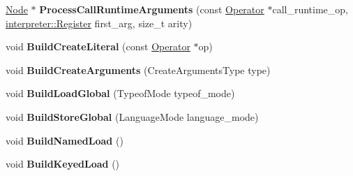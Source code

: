 \begin{DoxyCompactItemize}
\item 
\hyperlink{classv8_1_1internal_1_1compiler_1_1_node}{Node} $\ast$ {\bfseries Process\+Call\+Runtime\+Arguments} (const \hyperlink{classv8_1_1internal_1_1compiler_1_1_operator}{Operator} $\ast$call\+\_\+runtime\+\_\+op, \hyperlink{classv8_1_1internal_1_1interpreter_1_1_register}{interpreter\+::\+Register} first\+\_\+arg, size\+\_\+t arity)\hypertarget{classv8_1_1internal_1_1compiler_1_1_bytecode_graph_builder_afc15b521c4dcc16ef9607ebdf667f932}{}\label{classv8_1_1internal_1_1compiler_1_1_bytecode_graph_builder_afc15b521c4dcc16ef9607ebdf667f932}

\item 
void {\bfseries Build\+Create\+Literal} (const \hyperlink{classv8_1_1internal_1_1compiler_1_1_operator}{Operator} $\ast$op)\hypertarget{classv8_1_1internal_1_1compiler_1_1_bytecode_graph_builder_adef51fae2b000166245798eb8becff72}{}\label{classv8_1_1internal_1_1compiler_1_1_bytecode_graph_builder_adef51fae2b000166245798eb8becff72}

\item 
void {\bfseries Build\+Create\+Arguments} (Create\+Arguments\+Type type)\hypertarget{classv8_1_1internal_1_1compiler_1_1_bytecode_graph_builder_a464557078df06ee5310cfad6426cf9ff}{}\label{classv8_1_1internal_1_1compiler_1_1_bytecode_graph_builder_a464557078df06ee5310cfad6426cf9ff}

\item 
void {\bfseries Build\+Load\+Global} (Typeof\+Mode typeof\+\_\+mode)\hypertarget{classv8_1_1internal_1_1compiler_1_1_bytecode_graph_builder_ab8bc5a85555c275b8f4a6eeda789a51e}{}\label{classv8_1_1internal_1_1compiler_1_1_bytecode_graph_builder_ab8bc5a85555c275b8f4a6eeda789a51e}

\item 
void {\bfseries Build\+Store\+Global} (Language\+Mode language\+\_\+mode)\hypertarget{classv8_1_1internal_1_1compiler_1_1_bytecode_graph_builder_a5ee54c3ff34150487d6d39ae4ee96195}{}\label{classv8_1_1internal_1_1compiler_1_1_bytecode_graph_builder_a5ee54c3ff34150487d6d39ae4ee96195}

\item 
void {\bfseries Build\+Named\+Load} ()\hypertarget{classv8_1_1internal_1_1compiler_1_1_bytecode_graph_builder_a0a33c74e7bb0838cf114ba6c7ce45ed4}{}\label{classv8_1_1internal_1_1compiler_1_1_bytecode_graph_builder_a0a33c74e7bb0838cf114ba6c7ce45ed4}

\item 
void {\bfseries Build\+Keyed\+Load} ()\hypertarget{classv8_1_1internal_1_1compiler_1_1_bytecode_graph_builder_a84014c7ad937b3ed9ea12caa72907594}{}\label{classv8_1_1internal_1_1compiler_1_1_bytecode_graph_builder_a84014c7ad937b3ed9ea12caa72907594}


\end{DoxyCompactItemize}

